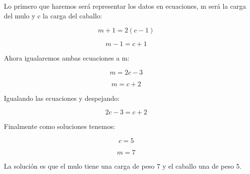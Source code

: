 Lo primero que haremos será representar los datos en ecuaciones, {m} será la carga del mulo y {c} la carga del caballo:

\begin{equation*}
  m+1 = 2(c-1)
\end{equation*}

\begin{equation*}
  m-1 = c+1
\end{equation*}

Ahora igualaremos ambas ecuaciones a {m}:

\begin{equation*}
  m = 2c-3
\end{equation*}

\begin{equation*}
  m = c+2
\end{equation*}

Igualando las ecuaciones y despejando:

\begin{equation*}
  2c-3 = c+2
\end{equation*}

Finalmente como soluciones tenemos:

\begin{equation*}
  c = 5
\end{equation*}

\begin{equation*}
  m = 7
\end{equation*}

La solución es que el mulo tiene una carga de peso 7 y el caballo una de peso 5.
